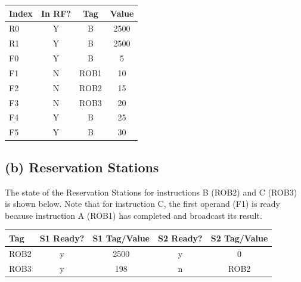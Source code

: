 \documentclass{article}
\begin{document}
\begin{table}[H]
	\centering
	\renewcommand{\arraystretch}{1.3}
	\begin{tabular}{|l|c|c|c|}
		\hline
		\textbf{Index} & \textbf{In RF?} & \textbf{Tag} & \textbf{Value} \\
		\hline
		R0             & Y               & B            & 2500           \\
		\hline
		R1             & Y               & B            & 2500           \\
		\hline
		F0             & Y               & B            & 5              \\
		\hline
		F1             & N               & ROB1         & 10             \\
		\hline
		F2             & N               & ROB2         & 15             \\
		\hline
		F3             & N               & ROB3         & 20             \\
		\hline
		F4             & Y               & B            & 25             \\
		\hline
		F5             & Y               & B            & 30             \\
		\hline
	\end{tabular}
\end{table}

\subsection{(b) Reservation Stations}
The state of the Reservation Stations for instructions B (ROB2) and C (ROB3) is shown below. Note that for instruction C, the first operand (F1) is ready because instruction A (ROB1) has completed and broadcast its result.

\begin{table}[H]
	\centering
	\renewcommand{\arraystretch}{1.3}
	\begin{tabular}{|l|c|c|c|c|}
		\hline
		\textbf{Tag} & \textbf{S1 Ready?} & \textbf{S1 Tag/Value} & \textbf{S2 Ready?} & \textbf{S2 Tag/Value} \\
		\hline
		ROB2         & y                  & 2500                  & y                  & 0                     \\
		\hline
		ROB3         & y                  & 198                   & n                  & ROB2                  \\
		\hline
	\end{tabular}
\end{table}
\end{document}
